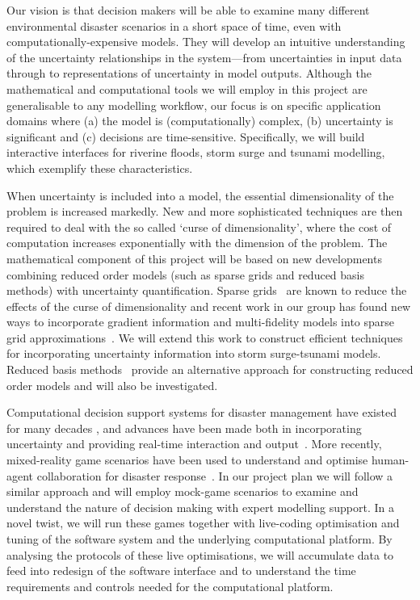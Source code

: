 Our vision is that decision makers will be able
to examine many different environmental disaster scenarios in a short
space of time, even with computationally-expensive models. They will 
develop an intuitive understanding of the uncertainty
relationships in the system---from uncertainties in input data through
to representations of uncertainty in model outputs. 
Although the mathematical and computational tools we will employ in
this project are generalisable to any modelling workflow, our focus is
on specific application domains where (a) the model is
(computationally) complex, (b) uncertainty is significant and (c)
decisions are time-sensitive. Specifically, we will build interactive
interfaces for riverine floods, storm surge and tsunami modelling,
which exemplify these characteristics.

When uncertainty is included into a model, the 
essential dimensionality of the problem is increased markedly.  
New and more sophisticated techniques are then required to deal with the so called
`curse of dimensionality', where
the cost of computation increases exponentially with the dimension of
the problem. 
The mathematical component of this project will be based on new
developments combining reduced order models 
(such as sparse grids and reduced basis methods)
with uncertainty quantification.
Sparse grids~\parencite{BungartzGriebel2004} are known to
reduce the effects of the curse of dimensionality and 
recent work in our group has found new ways to incorporate gradient
information and multi-fidelity models into sparse grid
approximations~\parencite{deBaarHarding2015,Jakeman2015,deBaarRDM2015}.
We will extend this work to construct efficient techniques 
for incorporating uncertainty  information into 
storm surge-tsunami models. 
Reduced basis 
methods~\parencite{quarteroni2015reduced} provide an 
alternative approach for constructing reduced order 
models and will also be investigated.

Computational decision support systems for disaster management have
existed for many decades \parencite{wallaceDecision1985}, and
advances have been made both in incorporating
uncertainty \parencite{thompsonSocial2014,nealeNavigating2015}
and providing real-time interaction and
output~\parencite{yuSupport2006}. More recently, mixed-reality game
scenarios have been used to understand and optimise human-agent
collaboration for disaster response~\parencite{ramchurn2016human}. In
our project plan we will follow a similar approach and will employ
mock-game scenarios to examine and understand the nature of decision
making with expert modelling support. In a novel twist, we will run
these games together with live-coding optimisation and tuning of the
software system and the underlying computational platform. By
analysing the protocols of these live optimisations, we will
accumulate data to feed into redesign of the software interface and to
understand the time requirements and controls needed for the
computational platform.

